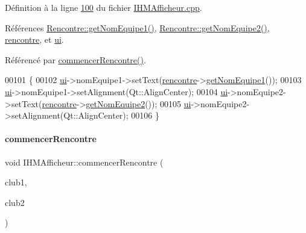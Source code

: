 Définition à la ligne \hyperlink{_i_h_m_afficheur_8cpp_source_l00100}{100} du fichier \hyperlink{_i_h_m_afficheur_8cpp_source}{I\+H\+M\+Afficheur.\+cpp}.



Références \hyperlink{_rencontre_8cpp_source_l00041}{Rencontre\+::get\+Nom\+Equipe1()}, \hyperlink{_rencontre_8cpp_source_l00049}{Rencontre\+::get\+Nom\+Equipe2()}, \hyperlink{_i_h_m_afficheur_8h_source_l00040}{rencontre}, et \hyperlink{_i_h_m_afficheur_8h_source_l00039}{ui}.



Référencé par \hyperlink{_i_h_m_afficheur_8cpp_source_l00090}{commencer\+Rencontre()}.


\begin{DoxyCode}
00101 \{
00102     \hyperlink{class_i_h_m_afficheur_a26ca43f1ff87b1caa2191adcce444d23}{ui}->nomEquipe1->setText(\hyperlink{class_i_h_m_afficheur_aef34d340f7ea30f049a98efc47bd9779}{rencontre}->\hyperlink{class_rencontre_a50df24caf57437d8eaaadae43ff846ec}{getNomEquipe1}());
00103     \hyperlink{class_i_h_m_afficheur_a26ca43f1ff87b1caa2191adcce444d23}{ui}->nomEquipe1->setAlignment(Qt::AlignCenter);
00104     \hyperlink{class_i_h_m_afficheur_a26ca43f1ff87b1caa2191adcce444d23}{ui}->nomEquipe2->setText(\hyperlink{class_i_h_m_afficheur_aef34d340f7ea30f049a98efc47bd9779}{rencontre}->\hyperlink{class_rencontre_ac544f97755480e0e2718d0802d308585}{getNomEquipe2}());
00105     \hyperlink{class_i_h_m_afficheur_a26ca43f1ff87b1caa2191adcce444d23}{ui}->nomEquipe2->setAlignment(Qt::AlignCenter);
00106 \}
\end{DoxyCode}
\mbox{\label{class_i_h_m_afficheur_ad2dc0742d9cdda731a16c570fd6f2434}} 
\paragraph{\texorpdfstring{commencer\+Rencontre}{commencerRencontre}}
{\footnotesize\ttfamily void I\+H\+M\+Afficheur\+::commencer\+Rencontre (\begin{DoxyParamCaption}\item[{Q\+String}]{club1,  }\item[{Q\+String}]{club2 }\end{DoxyParamCaption})\hspace{0.3cm}{\ttfamily [slot]}}



